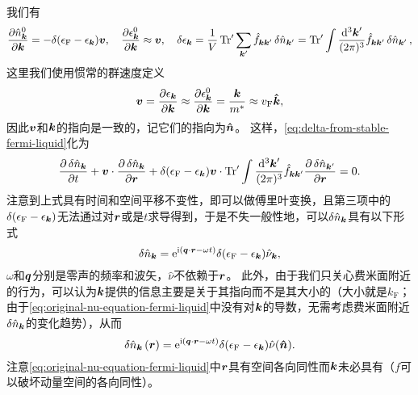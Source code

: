 我们有
\[
    \pdv{\hat{n}^0_{\vb*{k}}}{\vb*{k}} = - \delta(\epsilon_\text{F} - \epsilon_{\vb*{k}}) \vb*{v}, \quad  \pdv{\epsilon_{\vb*{k}}^0}{\vb*{k}} \approx \vb*{v}, \quad \var{\epsilon_{\vb*{k}}} = \frac{1}{V} \Trace' \sum_{\vb*{k}'} \hat{f}_{\vb*{k} \vb*{k}'} \var{\hat{n}_{\vb*{k}'}} = \Trace' \int \frac{\dd[3]{\vb*{k}'}}{(2\pi)^3} \hat{f}_{\vb*{k} \vb*{k}'} \var{\hat{n}_{\vb*{k}'}},
\]
这里我们使用惯常的群速度定义
\begin{equation}
    \vb*{v} = \pdv{\epsilon_{\vb*{k}}}{\vb*{k}} \approx \pdv{\epsilon^0_{\vb*{k}}}{\vb*{k}} = \frac{\vb*{k}}{m^*} \approx v_\text{F} \vu*{k},
\end{equation}
因此$\vb*{v}$和$\vb*{k}$的指向是一致的，记它们的指向为$\vu*{n}$。
这样，\eqref{eq:delta-from-stable-fermi-liquid}化为
\begin{equation}
    \pdv{\var{\hat{n}_{\vb*{k}}}}{t} + \vb*{v} \cdot \pdv{\var{\hat{n}_{\vb*{k}}}}{\vb*{r}} + \delta(\epsilon_\text{F} - \epsilon_{\vb*{k}}) \vb*{v} \cdot \Trace' \int \frac{\dd[3]{\vb*{k}'}}{(2\pi)^3} \hat{f}_{\vb*{k} \vb*{k}'} \pdv{\var{\hat{n}_{\vb*{k}'}}}{\vb*{r}} = 0.
    \label{eq:original-nu-equation-fermi-liquid}
\end{equation}
注意到上式具有时间和空间平移不变性，即可以做傅里叶变换，且第三项中的$\delta(\epsilon_\text{F} - \epsilon_{\vb*{k}})$无法通过对$\vb*{r}$或是$t$求导得到，于是不失一般性地，可以$\var{\hat{n}_{\vb*{k}}}$具有以下形式
\[
    \var{\hat{n}_{\vb*{k}}} = \mathrm{e}^{\mathrm{i} (\vb*{q} \cdot \vb*{r} - \omega t)} \delta(\epsilon_\text{F} - \epsilon_{\vb*{k}}) \hat{\nu}_{\vb*{k}},
\]
$\omega$和$\vb*{q}$分别是零声的频率和波矢，$\hat{\nu}$不依赖于$\vb*{r}$。
此外，由于我们只关心费米面附近的行为，可以认为$\vb*{k}$提供的信息主要是关于其指向而不是其大小的（大小就是$k_\text{F}$；由于\eqref{eq:original-nu-equation-fermi-liquid}中没有对$\vb*{k}$的导数，无需考虑费米面附近$\var{\hat{n}_{\vb*{k}}}$的变化趋势），从而
\begin{equation}
    \var{\hat{n}_{\vb*{k}}}(\vb*{r}) = \mathrm{e}^{\mathrm{i} (\vb*{q} \cdot \vb*{r} - \omega t)} \delta(\epsilon_\text{F} - \epsilon_{\vb*{k}}) \hat{\nu}(\vu*{n}).
    \label{eq:zero-sound-distribution-form}
\end{equation}
注意\eqref{eq:original-nu-equation-fermi-liquid}中$\vb*{r}$具有空间各向同性而$\vb*{k}$未必具有（$f$可以破坏动量空间的各向同性）。

